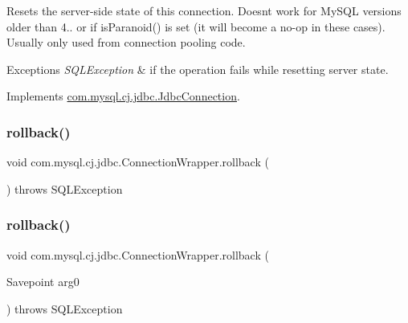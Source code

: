Resets the server-\/side state of this connection. Doesn\textquotesingle{}t work for My\+S\+QL versions older than 4.. or if is\+Paranoid() is set (it will become a no-\/op in these cases). Usually only used from connection pooling code.


\begin{DoxyExceptions}{Exceptions}
{\em S\+Q\+L\+Exception} & if the operation fails while resetting server state. \\
\hline
\end{DoxyExceptions}


Implements \mbox{\hyperlink{interfacecom_1_1mysql_1_1cj_1_1jdbc_1_1_jdbc_connection_a44456aec7737354a14eff20638c047fa}{com.\+mysql.\+cj.\+jdbc.\+Jdbc\+Connection}}.

\mbox{\label{classcom_1_1mysql_1_1cj_1_1jdbc_1_1_connection_wrapper_ad25f41ed3814457e349bdf1663425ac2}} 
\subsubsection{\texorpdfstring{rollback()}{rollback()}\hspace{0.1cm}{\footnotesize\ttfamily [1/2]}}
{\footnotesize\ttfamily void com.\+mysql.\+cj.\+jdbc.\+Connection\+Wrapper.\+rollback (\begin{DoxyParamCaption}{ }\end{DoxyParamCaption}) throws S\+Q\+L\+Exception}

\mbox{\label{classcom_1_1mysql_1_1cj_1_1jdbc_1_1_connection_wrapper_a279d20acb7eddf24fa3fa690e45a751d}} 
\subsubsection{\texorpdfstring{rollback()}{rollback()}\hspace{0.1cm}{\footnotesize\ttfamily [2/2]}}
{\footnotesize\ttfamily void com.\+mysql.\+cj.\+jdbc.\+Connection\+Wrapper.\+rollback (\begin{DoxyParamCaption}\item[{Savepoint}]{arg0 }\end{DoxyParamCaption}) throws S\+Q\+L\+Exception}

